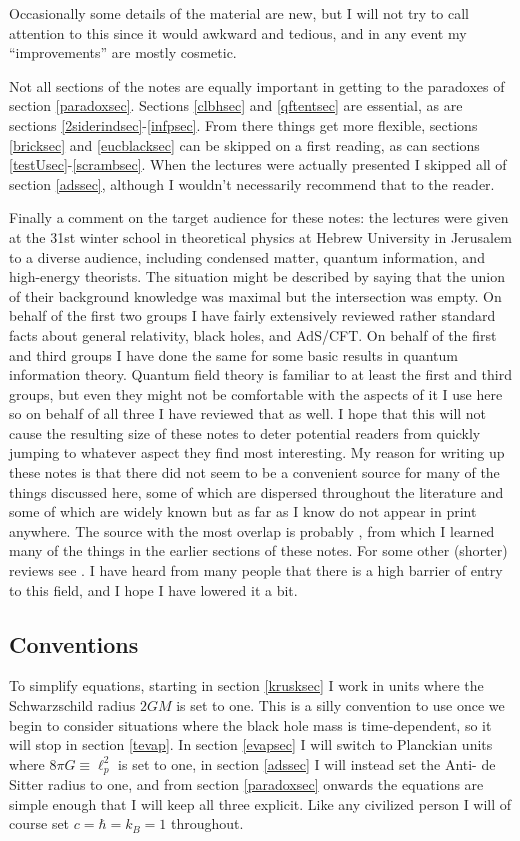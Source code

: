 \documentclass[12pt]{article}
\begin{document}
Occasionally some details of the material are new, but I will not try to call attention to this since it would awkward and tedious, and in any event my ``improvements'' are mostly cosmetic.  

Not all sections of the notes are equally important in getting to the paradoxes of section \ref{paradoxsec}.  Sections \ref{clbhsec} and \ref{qftentsec} are essential, as are sections \ref{2siderindsec}-\ref{infpsec}.  From there things get more flexible, sections \ref{bricksec} and \ref{eucblacksec} can be skipped on a first reading, as can sections \ref{testUsec}-\ref{scrambsec}.  When the lectures were actually presented I skipped all of section \ref{adssec}, although I wouldn't necessarily recommend that to the reader.

Finally a comment on the target audience for these notes: the lectures were given at the 31st winter school in theoretical physics at Hebrew University in Jerusalem to a diverse audience, including condensed matter, quantum information, and high-energy theorists.  The situation might be described by saying that the union of their background knowledge was maximal but the intersection was empty.  On behalf of the first two groups I have fairly extensively reviewed rather standard facts about general relativity, black holes, and AdS/CFT.  On behalf of the first and third groups I have done the same for some basic results in quantum information theory.  Quantum field theory is familiar to at least the first and third groups, but even they might not be comfortable with the aspects of it I use here so on behalf of all three I have reviewed that as well.  I hope that this will not cause the resulting size of these notes to deter potential readers from quickly jumping to whatever aspect they find most interesting.  My reason for writing up these notes is that there did not seem to be a convenient source for many of the things discussed here, some of which are dispersed throughout the literature and some of which are widely known but as far as I know do not appear in print anywhere.  The source with the most overlap is probably \cite{Susskind:2005js}, from which I learned many of the things in the earlier sections of these notes.  For some other (shorter) reviews see \cite{Preskill:1992tc,Giddings:1994pj,Mathur:2009hf}.  I have heard from many people that there is a high barrier of entry to this field, and I hope I have lowered it a bit.

\subsection{Conventions}
To simplify equations, starting in section \ref{krusksec} I work in units where the Schwarzschild radius $2GM$ is set to one.  This is a silly convention to use once we begin to consider situations where the black hole mass is time-dependent, so it will stop in section \ref{tevap}.  In section \ref{evapsec} I will switch to Planckian units where $8\pi G\equiv \ell_p^2$ is set to one, in section \ref{adssec} I will instead set the Anti- de Sitter radius to one, and from section \ref{paradoxsec} onwards the equations are simple enough that I will keep all three explicit.  Like any civilized person I will of course set $c=\hbar=k_B=1$ throughout.    
\end{document}
